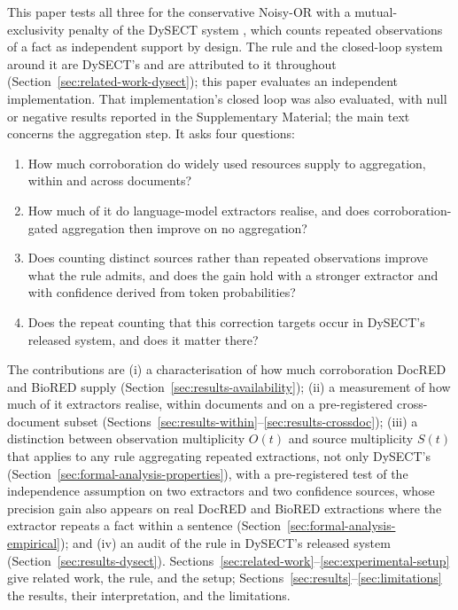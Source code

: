 \documentclass[preprint,12pt,authoryear]{elsarticle}
\begin{document}
This paper tests all three for the conservative Noisy-OR with a
mutual-exclusivity penalty of the DySECT system
\citep{aminnaseri2026dysect}, which counts repeated observations of a
fact as independent support by design. The rule and the closed-loop
system around it are DySECT's and are attributed to it throughout
(Section~\ref{sec:related-work-dysect}); this paper evaluates an
independent implementation. That implementation's closed loop was also
evaluated, with null or negative results reported in the Supplementary
Material; the main text concerns the aggregation step. It asks four
questions:

\begin{enumerate}
\item[\textbf{RQ1}] How much corroboration do widely used resources
supply to aggregation, within and across documents?
\item[\textbf{RQ2}] How much of it do language-model extractors realise,
and does corroboration-gated aggregation then improve on no aggregation?
\item[\textbf{RQ3}] Does counting distinct sources rather than repeated
observations improve what the rule admits, and does the gain hold with a
stronger extractor and with confidence derived from token probabilities?
\item[\textbf{RQ4}] Does the repeat counting that this correction
targets occur in DySECT's released system, and does it matter there?
\end{enumerate}

\noindent The contributions are (i) a characterisation of how much
corroboration DocRED and BioRED supply
(Section~\ref{sec:results-availability}); (ii) a measurement of how much
of it extractors realise, within documents and on a pre-registered
cross-document subset
(Sections~\ref{sec:results-within}--\ref{sec:results-crossdoc}); (iii) a
distinction between observation multiplicity $O(t)$ and source
multiplicity $S(t)$ that applies to any rule aggregating repeated
extractions, not only DySECT's (Section~\ref{sec:formal-analysis-properties}),
with a pre-registered test of the independence assumption on two
extractors and two confidence sources, whose precision gain also appears on real
DocRED and BioRED extractions where the extractor repeats a fact within a
sentence (Section~\ref{sec:formal-analysis-empirical});
and (iv) an audit of the rule in DySECT's released system
(Section~\ref{sec:results-dysect}). Sections~\ref{sec:related-work}--\ref{sec:experimental-setup}
give related work, the rule, and the setup;
Sections~\ref{sec:results}--\ref{sec:limitations} the results, their
interpretation, and the limitations.
\end{document}
